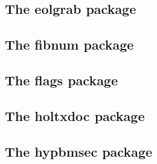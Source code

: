 \documentclass[a4paper,12pt]{article}
\makeatletter
\newcommand*{\xpackage}[1]{\textsf{#1}}
\newcommand*{\tocinclude}[1]{%
  \setcounter{tocdepth}{3}%
  \begingroup
    \makeatletter
    \def\@prj{#1}%
    \let\contentsline\foreign@contentsline
  \endgroup
}
\def\foreign@contentsline#1#2#3#4{%
  \ifx\\#4\\%
    \csname l@#1\endcsname{#2}{#3}%
  \else
    \ifHy@linktocpage
      \csname l@#1\endcsname{{#2}}{%
        \hyper@linkfile{#3}{\@prj.pdf}{#4}%
      }%
    \else
      \csname l@#1\endcsname{%
        \hyper@linkfile{#2}{\@prj.pdf}{#4}%
      }{#3}%
    \fi
  \fi
}%
\newcommand*{\pkgsectformat}[1]{%
  \texorpdfstring{%
    \textcolor{link}{The} %
    \xpackage{#1} %
    \textcolor{link}{package}%
  }{#1}%
}
\makeatother
\begin{document}
\newpage
\subsection{\pkgsectformat{eolgrab}}
\label{eolgrab}
\begin{abstract}
This package implements a generic argument grabber
to catch an argument that is delimited by the line end.
\end{abstract}
\tocinclude{eolgrab}

\newpage
\subsection{\pkgsectformat{fibnum}}
\label{fibnum}
\begin{abstract}
The package \xpackage{fibnum} provides expandable fibonacci
numbers for both  and .
\end{abstract}
\tocinclude{fibnum}

\newpage
\subsection{\pkgsectformat{flags}}
\label{flags}
\begin{abstract}
Package \xpackage{flags} allows the setting and clearing
of flags in bit fields and converts the bit field into a
decimal number. Currently the bit field is limited to 31 bits.
\end{abstract}
\tocinclude{flags}

\newpage
\subsection{\pkgsectformat{holtxdoc}}
\label{holtxdoc}
\begin{abstract}
The package is used for the documentation of my packages in
DTX format. It contains some private macros and setup for
my needs. Thus do not use it. I have separated the part
that may be useful for others in package \xpackage{hypdoc}.
\end{abstract}
\tocinclude{holtxdoc}

\newpage
\subsection{\pkgsectformat{hypbmsec}}
\label{hypbmsec}
\begin{abstract}
This package expands the syntax of the sectioning commands. If the
argument of the sectioning commands isn't usable as outline entry,
a replacement for the bookmarks can be given.
\end{abstract}
\tocinclude{hypbmsec}
\end{document}
